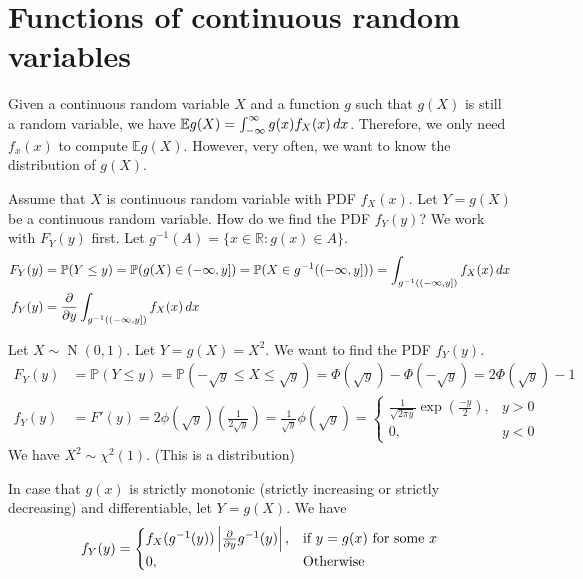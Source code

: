 \documentclass{huhtakm-template-book}
\newcommand{\prob}{\mathbb{P}}
\newcommand{\expect}{\mathbb{E}}
\DeclareMathOperator{\N}{N}
\begin{document}
\section{Functions of continuous random variables}
Given a continuous random variable $X$ and a function $g$ such that $g(X)$ is still a random variable, we have $\expect g(X)=\intinfty g(x)f_{X}(x)\,dx$. Therefore, we only need $f_{x}(x)$ to compute $\expect g(X)$. However, very often, we want to know the distribution of $g(X)$.
\begin{eg}
	Assume that $X$ is continuous random variable with PDF $f_{X}(x)$. Let $Y=g(X)$ be a continuous random variable. How do we find the PDF $f_{Y}(y)$? We work with $F_{Y}(y)$ first. Let $g^{-1}(A)=\{x\in\mathbb{R}:g(x)\in A\}$.
	\begin{align*}
		F_{Y}(y)&=\prob(Y\leq y)=\prob(g(X)\in(-\infty,y])=\prob(X\in g^{-1}((-\infty,y]))=\int_{g^{-1}((-\infty,y])}f_{X}(x)\,dx\\
		f_{Y}(y)&=\pdv*{\int_{g^{-1}((-\infty,y])}f_{X}(x)\,dx}{y}
	\end{align*}
\end{eg}
\begin{eg}
	Let $X\sim\N(0,1)$. Let $Y=g(X)=X^{2}$. We want to find the PDF $f_{Y}(y)$.
	\begin{align*}
		F_{Y}(y)&=\prob(Y\leq y)=\prob(-\sqrt{y}\leq X\leq \sqrt{y})=\Phi(\sqrt{y})-\Phi(-\sqrt{y})=2\Phi(\sqrt{y})-1\\
		f_{Y}(y)&=F'(y)=2\phi(\sqrt{y})\left(\frac{1}{2\sqrt{y}}\right)=\frac{1}{\sqrt{y}}\phi(\sqrt{y})=\begin{cases}
			\frac{1}{\sqrt{2\pi y}}\exp\left(\frac{-y}{2}\right), &y>0\\
			0, &y<0
		\end{cases}
	\end{align*}
	We have $X^{2}\sim\chi^{2}(1)$. (This is a distribution)
\end{eg}
\begin{thm}
	In case that $g(x)$ is strictly monotonic (strictly increasing or strictly decreasing) and differentiable, let $Y=g(X)$. We have
	\begin{equation*}
		f_{Y}(y)=\begin{cases}
			f_{X}(g^{-1}(y))\left|{\pdv*{g^{-1}(y)}{y}}\right|, &\text{if }y=g(x)\text{ for some }x\\
			0, &\text{Otherwise}
		\end{cases}
	\end{equation*}
\end{thm}
\end{document}
